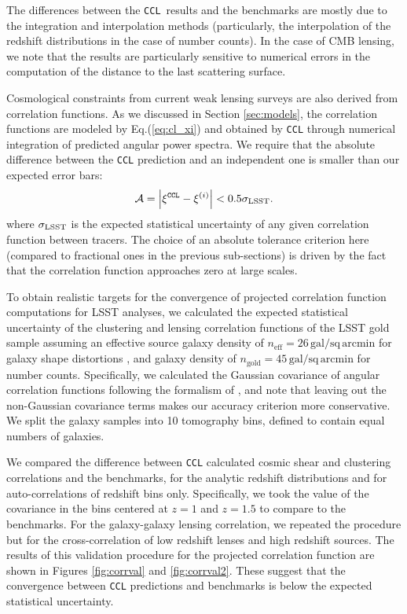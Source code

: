 \documentclass[\docopts]{\docclass}
\newcommand{\ccl}{{\tt CCL}\xspace}
\begin{document}
The differences between the \ccl~results and the benchmarks are mostly due to the integration and interpolation methods (particularly, the interpolation of the redshift distributions in the case of number counts). In the case of CMB lensing, we note that the results are particularly sensitive to numerical errors in the computation of the distance to the last scattering surface.

Cosmological constraints from current weak lensing surveys are also derived from correlation functions. As we discussed in Section \ref{sec:models}, the correlation functions are modeled by Eq.(\ref{eq:cl_xi}) and obtained by \ccl through numerical integration of predicted angular power spectra. We require that the absolute difference between the \ccl prediction and an independent one is smaller than our expected error bars:
\begin{equation}
  \mathcal{A}=\left|\xi^{\tt CCL}-\xi^{(i)}\right|<0.5\sigma_{\rm LSST}.
\end{equation}
where $\sigma_{\rm LSST}$ is the expected statistical uncertainty of any given correlation function between tracers. The choice of an absolute tolerance criterion here (compared to fractional ones in the previous sub-sections) is driven by the fact that the correlation function approaches zero at large scales.

To obtain realistic targets for the convergence of projected correlation function computations for LSST analyses, we calculated the expected statistical uncertainty of the clustering and lensing correlation functions of the LSST gold sample \citep{LSSTSB} assuming an effective source galaxy density of $n_\mathrm{eff} = 26\,\mathrm{gal/sq\,arcmin}$ for galaxy shape distortions \citep{Chang13}, and galaxy density of $n_\mathrm{gold} = 45\,\mathrm{gal/sq\,arcmin}$ for number counts. Specifically, we calculated the Gaussian covariance of angular correlation functions following the formalism of \citet{2008A&A...477...43J}, and note that leaving out the non-Gaussian covariance terms makes our accuracy criterion more conservative. We split the galaxy samples into 10 tomography bins, defined to contain equal numbers of galaxies.

We compared the difference between \ccl calculated cosmic shear and clustering correlations and the benchmarks, for the analytic redshift distributions and for auto-correlations of redshift bins only. Specifically, we took the value of the covariance in the bins centered at $z=1$ and $z=1.5$ to compare to the benchmarks. For the galaxy-galaxy lensing correlation, we repeated the procedure but for the cross-correlation of low redshift lenses and high redshift sources. The results of this validation procedure for the projected correlation function are shown in Figures \ref{fig:corrval} and \ref{fig:corrval2}. These suggest that the convergence between \ccl predictions and benchmarks is below the expected statistical uncertainty. 
\end{document}
